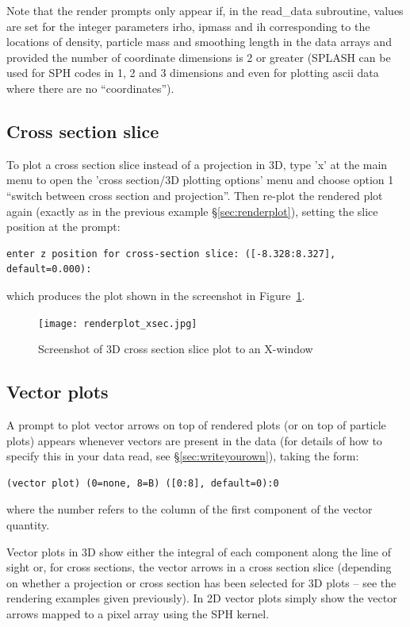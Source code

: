 \documentclass[a4paper,10pt]{article}
\newcommand{\splash}{\textsc{SPLASH }}
\begin{document}
 Note that the render prompts only appear if, in the read\_data subroutine, values are set for the integer parameters irho, ipmass and ih corresponding to the locations of density, particle mass and smoothing length in the data arrays and provided the number of coordinate dimensions is 2 or greater (\splash can be used for SPH codes in 1, 2 and 3 dimensions and even for plotting ascii data where there are no ``coordinates'').

\subsection{Cross section slice}
To plot a cross section slice instead of a projection in 3D, type 'x' at the main menu to open the 'cross section/3D plotting options' menu and choose option 1 ``switch between cross section and projection''. Then re-plot the rendered plot again (exactly as in the previous example \S\ref{sec:renderplot}), setting the slice position at the prompt:
\begin{verbatim}
enter z position for cross-section slice: ([-8.328:8.327], default=0.000):
\end{verbatim}
which produces the plot shown in the screenshot in Figure~\ref{fig:renderplot_xsec}.
\begin{figure}[h]
\begin{center}
\texttt{[image: renderplot\_xsec.jpg]}
\caption{Screenshot of 3D cross section slice plot to an X-window}
\label{fig:renderplot_xsec}
\end{center}
\end{figure}

\subsection{Vector plots}
 A prompt to plot vector arrows on top of rendered plots (or on top of particle plots) appears whenever vectors are present in the data (for details of how to specify this in your data read, see \S\ref{sec:writeyourown}), taking the form:
\begin{verbatim}
(vector plot) (0=none, 8=B) ([0:8], default=0):0
\end{verbatim}
where the number refers to the column of the first component of the vector quantity. 

Vector plots in 3D show either the integral of each component along the line of sight or, for cross sections, the vector arrows in a cross section slice (depending on whether a projection or cross section has been selected for 3D plots -- see the rendering examples given previously). In 2D vector plots simply show the vector arrows mapped to a pixel array using the SPH kernel.
\end{document}
